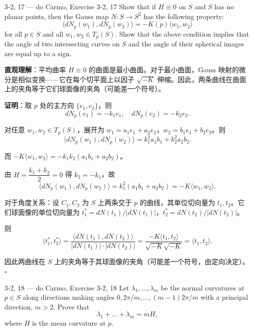 \begin{exercise}{3-2, 17 — do Carmo, Exercise 3-2, 17}
Show that if $H \equiv 0$ on $S$ and $S$ has no planar points, then the Gauss map $N \colon S \to S^2$ has the following property:
\[
\langle d N _ {p} \left(w _ {1}\right), d N _ {p} \left(w _ {2}\right) \rangle = - K (p) \langle w _ {1}, w _ {2} \rangle
\]
for all $p \in S$ and all $w_{1}, w_{2} \in T_{p}(S)$. Show that the above condition implies that the angle of two intersecting curves on $S$ and the angle of their spherical images are equal up to a sign.
\end{exercise}

\begin{solution}
\textbf{直观理解}：平均曲率 $H \equiv 0$ 的曲面是最小曲面。对于最小曲面，Gauss 映射的微分是相似变换——它在每个切平面上以因子 $\sqrt{-K}$ 伸缩。因此，两条曲线在曲面上的夹角等于它们球面像的夹角（可能差一个符号）。

\textbf{证明}：取 $p$ 处的主方向 $\{e_1, e_2\}$，则
\[
dN_p(e_1) = -k_1 e_1, \quad dN_p(e_2) = -k_2 e_2.
\]

对任意 $w_1, w_2 \in T_p(S)$，展开为 $w_1 = a_1 e_1 + a_2 e_2$，$w_2 = b_1 e_1 + b_2 e_2$。则
\[
\langle dN_p(w_1), dN_p(w_2) \rangle = k_1^2 a_1 b_1 + k_2^2 a_2 b_2.
\]

而 $-K \langle w_1, w_2 \rangle = -k_1 k_2 (a_1 b_1 + a_2 b_2)$。

由 $H = \dfrac{k_1 + k_2}{2} = 0$ 得 $k_2 = -k_1$，故
\[
\langle dN_p(w_1), dN_p(w_2) \rangle = k_1^2 (a_1 b_1 + a_2 b_2) = -K \langle w_1, w_2 \rangle.
\]

对于角度关系：设 $C_1, C_2$ 为 $S$ 上两条交于 $p$ 的曲线，其单位切向量为 $t_1, t_2$。它们球面像的单位切向量为 $t_1^* = dN(t_1) / |dN(t_1)|$，$t_2^* = dN(t_2) / |dN(t_2)|$。

则
\[
\langle t_1^*, t_2^* \rangle = \frac{\langle dN(t_1), dN(t_2) \rangle}{|dN(t_1)| \cdot |dN(t_2)|} = \frac{-K \langle t_1, t_2 \rangle}{\sqrt{-K} \sqrt{-K}} = \langle t_1, t_2 \rangle.
\]

因此两曲线在 $S$ 上的夹角等于其球面像的夹角（可能差一个符号，由定向决定）。$\square$
\end{solution}

\begin{exercise}{3-2, 18 — do Carmo, Exercise 3-2, 18}
Let $\lambda_1, \ldots, \lambda_m$ be the normal curvatures at $p \in S$ along directions making angles $0, 2\pi / m, \ldots, (m - 1)2\pi / m$ with a principal direction, $m > 2$. Prove that
\[
\lambda_ {1} + \dots + \lambda_ {m} = m H,
\]
where $H$ is the mean curvature at $p$.
\end{exercise}


